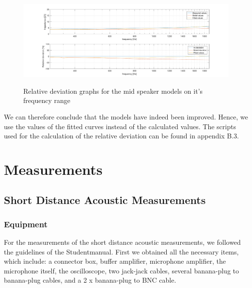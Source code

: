 \documentclass{article}
\begin{document}
\begin{figure}[H]
  \centering
  \includegraphics[height=0.15\paperheight]{Figures/Relative_Deviation_Mid_Impedance_Models.pdf}%
  \label{fig:Relative_Deviation_Mid_Impedance_Models_inText}
  \caption{Relative deviation graphs for the mid speaker models on it's frequency range}
\end{figure}

We can therefore conclude that the models have indeed been improved. Hence, we use the values of the fitted curves instead of the calculated values. 
\newline
\newline
The scripts used for the calculation of the relative deviation can be found in appendix B.3.


\section{Measurements}
\subsection{Short Distance Acoustic Measurements}
\subsubsection{Equipment}
For the measurements of the short distance acoustic measurements, we followed the guidelines of the Studentmanual. First we obtained all the necessary items, which include: a connector box, buffer amplifier, microphone amplifier, the microphone itself, the oscilloscope, two jack-jack cables, several banana-plug to banana-plug cables, and a 2 x banana-plug to BNC cable.
\end{document}
